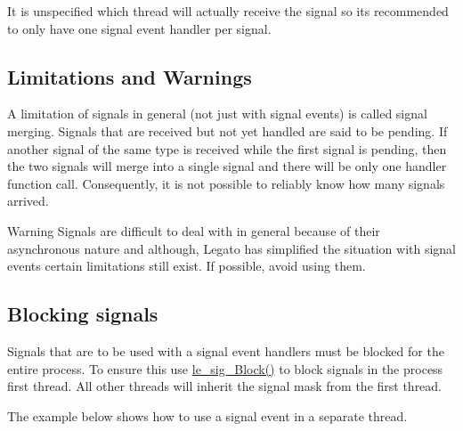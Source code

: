 It is unspecified which thread will actually receive the signal so it\textquotesingle{}s recommended to only have one signal event handler per signal.\hypertarget{c_signals_c_signals_limitations}{}\subsection{Limitations and Warnings}\label{c_signals_c_signals_limitations}
A limitation of signals in general (not just with signal events) is called signal merging. Signals that are received but not yet handled are said to be pending. If another signal of the same type is received while the first signal is pending, then the two signals will merge into a single signal and there will be only one handler function call. Consequently, it is not possible to reliably know how many signals arrived.

\begin{DoxyWarning}{Warning}
Signals are difficult to deal with in general because of their asynchronous nature and although, Legato has simplified the situation with signal events certain limitations still exist. If possible, avoid using them.
\end{DoxyWarning}
\hypertarget{c_signals_c_signals_blocking}{}\subsection{Blocking signals}\label{c_signals_c_signals_blocking}
Signals that are to be used with a signal event handlers must be blocked for the entire process. To ensure this use \hyperlink{le__signals_8h_a095ec12deab6b6ed0475583586a6c4d7}{le\+\_\+sig\+\_\+\+Block()} to block signals in the process\textquotesingle{} first thread. All other threads will inherit the signal mask from the first thread.

The example below shows how to use a signal event in a separate thread.


